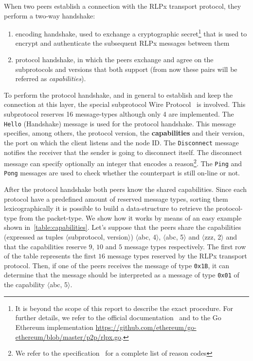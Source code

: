When two peers establish a connection with the RLPx transport protocol, they
perform a two-way handshake:
\begin{enumerate}
  \item encoding handshake, used to exchange a cryptographic secret\footnote{It
  is beyond the scope of this report to describe the exact procedure. For
  further details, we refer to the official documentation~\cite{rlpx} and to the
  Go Ethereum implementation
  \url{https://github.com/ethereum/go-ethereum/blob/master/p2p/rlpx.go}.}
  that is used to encrypt and authenticate the subsequent RLPx messages between
  them
  \item protocol handshake, in which the peers exchange and agree on the
  subprotocols and versions that both support (from now these pairs will be
  referred as \emph{capabilities}).
\end{enumerate}

To perform the protocol handshake, and in general to establish and keep the
connection at this layer, the special subprotocol \devpp{} Wire
Protocol~\cite{devp2pwire} is involved. This subprotocol reserves 16
message-types although only 4 are implemented. The \verb+Hello+ (Handshake)
message is used for the protocol handshake. This message specifies, among
others, the protocol version, the \textbf{capabilities} and their version, the
port on which the client listens and the node ID. The \verb+Disconnect+ message
notifies the receiver that the sender is going to disconnect itself. The
disconnect message can specify optionally an integer that encodes a
reason\footnote{We refer to the \devpp{} specification~\cite{devp2pwire} for a
complete list of reason codes}. The \verb+Ping+ and \verb+Pong+ messages are
used to check whether the counterpart is still on-line or not.

After the protocol handshake both peers know the shared capabilities. Since each
protocol have a predefined amount of reserved message types, sorting them
lexicographically it is possible to build a data-structure to retrieve the
protocol-type from the packet-type. We show how it works by means of an easy
example shown in~\autoref{table:capabilities}. Let's suppose that the peers
share the capabilities (expressed as tuples $\langle$subprotocol,
version$\rangle$) $\langle$abc, 4$\rangle$, $\langle$abc, 5$\rangle$ and
$\langle$zzz, 2$\rangle$ and that the capabilities reserve $9$, $10$ and $5$
message types respectively. The first row of the table represents the first $16$
message types reserved by the RLPx transport protocol. Then, if one of the peers
receives the message of type \texttt{0x1B}, it can determine that the message
should be interpreted as a message of type \texttt{0x01} of the capability
$\langle$abc, 5$\rangle$.

